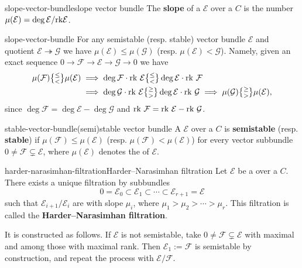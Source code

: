 \begin{topic}{slope-vector-bundle}{slope vector bundle}
    The \textbf{slope} of a  $\mathcal{E}$ over a  $C$ is the number $\mu(\mathcal{E}) = \deg \mathcal{E} / \textup{rk} \mathcal{E}$.
\end{topic}

\begin{example}{slope-vector-bundle}
    For any semistable (resp. stable) vector bundle $\mathcal{E}$ and quotient $\mathcal{E} \twoheadrightarrow \mathcal{G}$ we have $\mu(\mathcal{E}) \le \mu(\mathcal{G})$ (resp. $\mu(\mathcal{E}) < \mathcal{G}$). Namely, given an exact sequence $0 \to \mathcal{F} \to \mathcal{E} \to \mathcal{G} \to 0$ we have
    \[ \begin{aligned} \mu(\mathcal{F}) \genfrac{\{}{\}}{0pt}{1}{\le}{<} \mu(\mathcal{E}) &\implies \deg \mathcal{F} \cdot \textup{rk } \mathcal{E} \genfrac{\{}{\}}{0pt}{1}{\le}{<} \deg \mathcal{E} \cdot \textup{rk } \mathcal{F} \\ &\implies \deg \mathcal{G} \cdot \textup{rk } \mathcal{E} \genfrac{\{}{\}}{0pt}{1}{\ge}{>} \deg \mathcal{E} \cdot \textup{rk } \mathcal{G} \implies \mu(\mathcal{G}) \genfrac{\{}{\}}{0pt}{1}{\ge}{>} \mu(\mathcal{E})  , \end{aligned} \]
    since $\deg \mathcal{F} = \deg \mathcal{E} - \deg \mathcal{G}$ and $\textup{rk } \mathcal{F} = \textup{rk } \mathcal{E} - \textup{rk } \mathcal{G}$.
\end{example}

\begin{topic}{stable-vector-bundle}{(semi)stable vector bundle}
    A  $\mathcal{E}$ over a  $C$ is \textbf{semistable} (resp. \textbf{stable}) if $\mu(\mathcal{F}) \le \mu(\mathcal{E})$ (resp. $\mu(\mathcal{F}) < \mu(\mathcal{E})$) for every vector subbundle $0 \ne \mathcal{F} \subsetneq \mathcal{E}$, where $\mu(\mathcal{E})$ denotes the  of $\mathcal{E}$.
\end{topic}

\begin{topic}{harder-narasimhan-filtration}{Harder--Narasimhan filtration}
    Let $\mathcal{E}$ be a  over a  $C$. There exists a unique filtration by subbundles
    \[ 0 = \mathcal{E}_0 \subset \mathcal{E}_1 \subset \cdots \subset \mathcal{E}_{r + 1} = \mathcal{E} \]
    such that $\mathcal{E}_{i + 1}/\mathcal{E}_i$ are  with slope $\mu_i$, where $\mu_1 > \mu_2 > \cdots > \mu_r$. This filtration is called the \textbf{Harder--Narasimhan filtration}.
    
    It is constructed as follows. If $\mathcal{E}$ is not semistable, take $0 \ne \mathcal{F} \subsetneq \mathcal{E}$ with maximal  and among those with maximal rank. Then $\mathcal{E}_1 := \mathcal{F}$ is semistable by construction, and repeat the process with $\mathcal{E}/\mathcal{F}$.
\end{topic}

